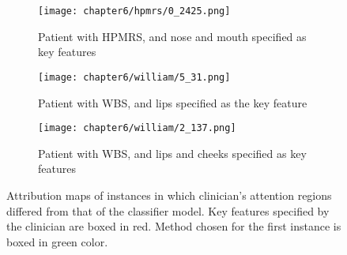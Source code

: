 \documentclass[../report.tex]{subfiles}
\begin{document}
	\begin{figure}[H]
		\begin{subfigure}[t]{1\textwidth}
			\centering
			\texttt{[image: chapter6/hpmrs/0\_2425.png]}
			\caption{Patient with  HPMRS, and nose and mouth specified as key features}
			\label{sfig_diff_1}
		\end{subfigure}
		\begin{subfigure}[t]{1\textwidth}
			\centering
			\texttt{[image: chapter6/william/5\_31.png]}
			\caption{Patient with  WBS, and lips specified as the key feature}
			\label{sfig_diff_2}
		\end{subfigure}
		\begin{subfigure}[t]{1\textwidth}
		\centering
		\texttt{[image: chapter6/william/2\_137.png]}
		\caption{Patient with  WBS, and lips and cheeks specified as key features}
		\label{sfig_diff_3}
		\end{subfigure}
		\begin{subfigure}[t]{1\textwidth}
		\end{subfigure}
		\caption[Attribution maps of instances in which clinician's attention regions differed from that of the classifier model]{Attribution maps of instances in which clinician's attention regions differed from that of the classifier model. Key features specified by the clinician are boxed in red. Method chosen for the first instance is boxed in green color.}
		\label{fig_diff_cl_maps}
	\end{figure}
\end{document}
